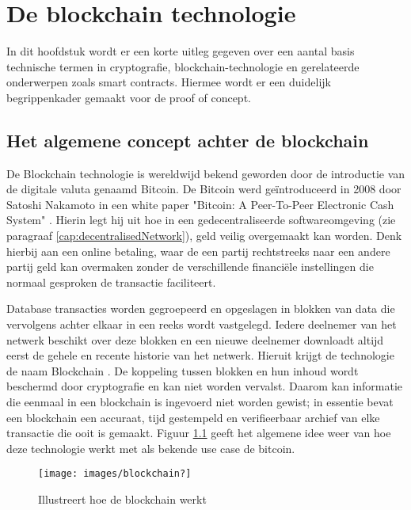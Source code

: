 \chapter{De blockchain technologie}\label{chap:q1}
In dit hoofdstuk wordt er een korte uitleg gegeven over een aantal basis technische termen in cryptografie, blockchain-technologie en gerelateerde onderwerpen zoals smart contracts. Hiermee wordt er een duidelijk begrippenkader gemaakt voor de proof of concept.

\section{Het algemene concept achter de blockchain}
De Blockchain technologie is wereldwijd bekend geworden door de introductie van de digitale valuta genaamd Bitcoin. De Bitcoin werd geïntroduceerd in 2008 door Satoshi Nakamoto in een white paper "Bitcoin: A Peer-To-Peer Electronic Cash System" \cite{bitcoinPaper}. Hierin legt hij uit hoe in een gedecentraliseerde softwareomgeving (zie paragraaf \ref{cap:decentralisedNetwork}), geld veilig overgemaakt kan worden. Denk hierbij aan een online betaling, waar de een partij rechtstreeks naar een andere partij geld kan overmaken zonder de verschillende financiële instellingen die normaal gesproken de transactie faciliteert.\par

Database transacties worden gegroepeerd en opgeslagen in blokken van data die vervolgens achter elkaar in een reeks wordt vastgelegd. Iedere deelnemer van het netwerk beschikt over deze blokken en een nieuwe deelnemer downloadt altijd eerst de gehele en recente historie van het netwerk. Hieruit krijgt de technologie de naam Blockchain \cite{blochchainTechSymmbioticDev}. De koppeling tussen blokken en hun inhoud wordt beschermd door cryptografie en kan niet worden vervalst. Daarom kan informatie die eenmaal in een blockchain is ingevoerd niet worden gewist; in essentie bevat een blockchain een accuraat, tijd gestempeld en verifieerbaar archief van elke transactie die ooit is gemaakt. Figuur \ref{fig:blockchain?} geeft het algemene idee weer van hoe deze technologie werkt met als bekende use case de bitcoin.
\begin{figure}[h]
    \begin{center}
        \texttt{[image: images/blockchain?]}
        \caption{Illustreert hoe de blockchain werkt \cite{howBlockchainWorks}}
        \label{fig:blockchain?}
    \end{center}
\end{figure}
\newpage

